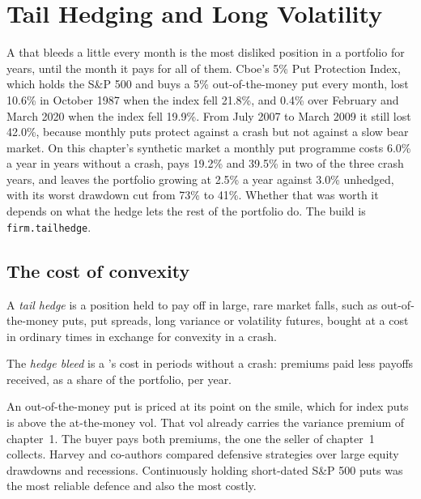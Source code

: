 \chapter{Tail Hedging and Long Volatility}\label{ch:s2:tail-hedging-and-long-volatility}

A  that bleeds a little every month is the most disliked position in a portfolio for years, until the month it pays for all of them. Cboe's
5\% Put Protection Index, which holds the S\&P 500 and buys a 5\% out-of-the-money put every month, lost 10.6\% in October 1987 when the index fell
21.8\%, and 0.4\% over February and March 2020 when the index fell 19.9\%. From July 2007 to March 2009 it still lost 42.0\%, because monthly puts
protect against a crash but not against a slow bear market. On this chapter's synthetic market a monthly put programme costs 6.0\% a year in years
without a crash, pays 19.2\% and 39.5\% in two of the three crash years, and leaves the portfolio growing at 2.5\% a year against 3.0\% unhedged,
with its worst drawdown cut from 73\% to 41\%. Whether that was worth it depends on what the hedge lets the rest of the portfolio do. The build is
\texttt{firm.tailhedge}.

\section{The cost of convexity}

\begin{definition}\label{def:s2:tail-hedging-and-long-volatility:hedge}
A \emph{tail hedge} is a position held to pay off in large, rare market falls, such as out-of-the-money puts, put spreads, long
variance or volatility futures, bought at a cost in ordinary times in exchange for convexity in a crash.
\end{definition}

\begin{definition}\label{def:s2:tail-hedging-and-long-volatility:bleed}
The \emph{hedge bleed} is a 's cost in periods without a crash: premiums paid less payoffs received, as a share of the
portfolio, per year.
\end{definition}

An out-of-the-money put is priced at its point on the smile, which for index puts is above the at-the-money vol. That vol already carries the variance
premium of chapter~1. The buyer pays both premiums, the one the seller of chapter~1 collects. Harvey and co-authors compared defensive strategies over
large equity drawdowns and recessions. Continuously holding short-dated S\&P 500 puts was the most reliable defence and also the most costly.

